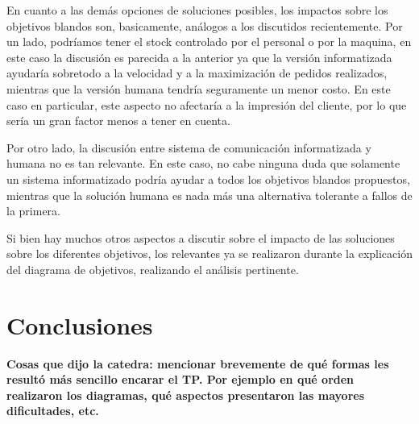 \documentclass[a4paper,10pt]{article}
\begin{document}
\medskip

En cuanto a las dem\'as opciones de soluciones posibles, los impactos sobre los objetivos blandos son, basicamente, an\'alogos a los discutidos
recientemente. Por un lado, podr\'iamos tener el stock controlado por el personal o por la maquina, en este caso la discusi\'on es parecida a la anterior
ya que la versi\'on informatizada ayudar\'ia sobretodo a la velocidad y a la maximizaci\'on de pedidos realizados, mientras que la versi\'on humana
tendr\'ia seguramente un menor costo. En este caso en particular, este aspecto no afectar\'ia a la impresi\'on del cliente, por lo que ser\'ia un
gran factor menos a tener en cuenta.

Por otro lado, la discusi\'on entre sistema de comunicaci\'on informatizada y humana no es tan relevante. En este caso, no cabe ninguna duda que 
solamente un sistema informatizado podr\'ia ayudar a todos los objetivos blandos propuestos, mientras que la soluci\'on humana es nada m\'as una alternativa
tolerante a fallos de la primera.
\medskip

Si bien hay muchos otros aspectos a discutir sobre el impacto de las soluciones sobre los diferentes objetivos, los relevantes ya se realizaron
durante la explicaci\'on del diagrama de objetivos, realizando el an\'alisis pertinente.
 

\newpage
\section*{Conclusiones}

\textbf{Cosas que dijo la catedra: mencionar brevemente de qué formas les resultó más sencillo encarar el TP. Por ejemplo en qué orden realizaron los diagramas, qué aspectos presentaron las mayores dificultades, etc.}
\end{document}
